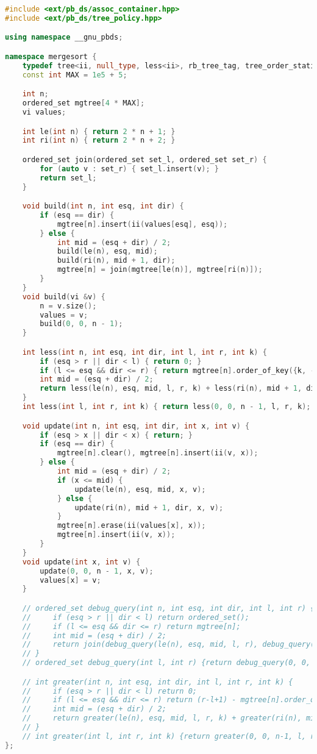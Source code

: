 \documentclass[11pt, a4paper, twoside]{article}
\begin{document}
\begin{lstlisting}[language=C++]
#include <ext/pb_ds/assoc_container.hpp>
#include <ext/pb_ds/tree_policy.hpp>

using namespace __gnu_pbds;

namespace mergesort {
    typedef tree<ii, null_type, less<ii>, rb_tree_tag, tree_order_statistics_node_update> ordered_set;
    const int MAX = 1e5 + 5;

    int n;
    ordered_set mgtree[4 * MAX];
    vi values;

    int le(int n) { return 2 * n + 1; }
    int ri(int n) { return 2 * n + 2; }

    ordered_set join(ordered_set set_l, ordered_set set_r) {
        for (auto v : set_r) { set_l.insert(v); }
        return set_l;
    }

    void build(int n, int esq, int dir) {
        if (esq == dir) {
            mgtree[n].insert(ii(values[esq], esq));
        } else {
            int mid = (esq + dir) / 2;
            build(le(n), esq, mid);
            build(ri(n), mid + 1, dir);
            mgtree[n] = join(mgtree[le(n)], mgtree[ri(n)]);
        }
    }
    void build(vi &v) {
        n = v.size();
        values = v;
        build(0, 0, n - 1);
    }

    int less(int n, int esq, int dir, int l, int r, int k) {
        if (esq > r || dir < l) { return 0; }
        if (l <= esq && dir <= r) { return mgtree[n].order_of_key({k, -1}); }
        int mid = (esq + dir) / 2;
        return less(le(n), esq, mid, l, r, k) + less(ri(n), mid + 1, dir, l, r, k);
    }
    int less(int l, int r, int k) { return less(0, 0, n - 1, l, r, k); }

    void update(int n, int esq, int dir, int x, int v) {
        if (esq > x || dir < x) { return; }
        if (esq == dir) {
            mgtree[n].clear(), mgtree[n].insert(ii(v, x));
        } else {
            int mid = (esq + dir) / 2;
            if (x <= mid) {
                update(le(n), esq, mid, x, v);
            } else {
                update(ri(n), mid + 1, dir, x, v);
            }
            mgtree[n].erase(ii(values[x], x));
            mgtree[n].insert(ii(v, x));
        }
    }
    void update(int x, int v) {
        update(0, 0, n - 1, x, v);
        values[x] = v;
    }

    // ordered_set debug_query(int n, int esq, int dir, int l, int r) {
    //     if (esq > r || dir < l) return ordered_set();
    //     if (l <= esq && dir <= r) return mgtree[n];
    //     int mid = (esq + dir) / 2;
    //     return join(debug_query(le(n), esq, mid, l, r), debug_query(ri(n), mid+1, dir, l, r));
    // }
    // ordered_set debug_query(int l, int r) {return debug_query(0, 0, n-1, l, r);}

    // int greater(int n, int esq, int dir, int l, int r, int k) {
    //     if (esq > r || dir < l) return 0;
    //     if (l <= esq && dir <= r) return (r-l+1) - mgtree[n].order_of_key({k, 1e8});
    //     int mid = (esq + dir) / 2;
    //     return greater(le(n), esq, mid, l, r, k) + greater(ri(n), mid+1, dir, l, r, k);
    // }
    // int greater(int l, int r, int k) {return greater(0, 0, n-1, l, r, k);}
};
\end{lstlisting}
\end{document}
